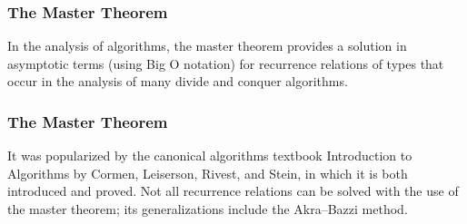 
\begin{frame}
\frametitle{The Master Theorem}
In the analysis of algorithms, the master theorem provides a solution in asymptotic terms (using Big O notation) for recurrence relations of types that occur in the analysis of many divide and conquer algorithms. 

\end{frame}
\begin{frame}
\frametitle{The Master Theorem}
It was popularized by the canonical algorithms textbook Introduction to Algorithms by Cormen, Leiserson, Rivest, and Stein, in which it is both introduced and proved. Not all recurrence relations can be solved with the use of the master theorem; its generalizations include the Akra–Bazzi method.

\end{frame}


